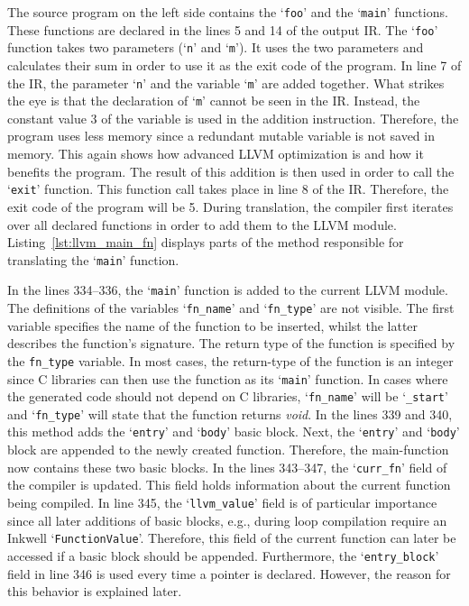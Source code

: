 The source program on the left side contains the `\texttt{foo}' and the `\texttt{main}' functions.
These functions are declared in the lines 5 and 14 of the output IR\@.
The `\texttt{foo}' function takes two parameters (`\texttt{n}' and `\texttt{m}').
It uses the two parameters and calculates their sum in order to use it as the exit code of the program.
In line 7 of the IR, the parameter `\texttt{n}' and the variable `\texttt{m}' are added together.
What strikes the eye is that the declaration of `\texttt{m}' cannot be seen in the IR\@.
Instead, the constant value 3 of the variable is used in the addition instruction.
Therefore, the program uses less memory since a redundant mutable variable is not saved in memory.
This again shows how advanced LLVM optimization is and how it benefits the program.
The result of this addition is then used in order to call the `\texttt{exit}' function.
This function call takes place in line 8 of the IR\@.
Therefore, the exit code of the program will be 5.
During translation, the compiler first iterates over all declared functions in order to add them to the LLVM module.
Listing~\ref{lst:llvm_main_fn} displays parts of the method responsible for translating the `\texttt{main}' function.


In the lines 334--336, the `\texttt{main}' function is added to the current LLVM module.
The definitions of the variables `\texttt{fn\_name}' and `\texttt{fn\_type}' are not visible.
The first variable specifies the name of the function to be inserted, whilst the latter describes the function's signature.
The return type of the function is specified by the \texttt{fn\_type} variable.
In most cases, the return-type of the function is an integer since C libraries can then use the function as its `\texttt{main}' function.
In cases where the generated code should not depend on C libraries, `\Verb|fn_name|' will be `\Verb|_start|' and `\Verb|fn_type|' will state that the function returns \emph{void}.
In the lines 339 and 340, this method adds the `\texttt{entry}' and `\texttt{body}' basic block.
Next, the `\texttt{entry}' and `\texttt{body}' block are appended to the newly created function.
Therefore, the main-function now contains these two basic blocks.
In the lines 343--347, the `\Verb|curr_fn|' field of the compiler is updated.
This field holds information about the current function being compiled.
In line 345, the `\Verb|llvm_value|' field is of particular importance since all later additions of basic blocks, e.g., during loop compilation require an Inkwell `\texttt{FunctionValue}'.
Therefore, this field of the current function can later be accessed if a basic block should be appended.
Furthermore, the `\Verb|entry_block|' field in line 346 is used every time a pointer is declared.
However, the reason for this behavior is explained later.

